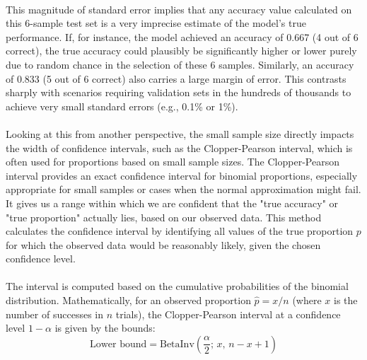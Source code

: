 \documentclass[12pt,a4paper]{report}
\begin{document}
\\
This magnitude of standard error implies that any accuracy value calculated on this 6-sample test set is a very imprecise estimate of the model's true performance. If, for instance, the model achieved an accuracy of 0.667 (4 out of 6 correct), the true accuracy could plausibly be significantly higher or lower purely due to random chance in the selection of these 6 samples. Similarly, an accuracy of 0.833 (5 out of 6 correct) also carries a large margin of error. This contrasts sharply with scenarios requiring validation sets in the hundreds of thousands to achieve very small standard errors (e.g., 0.1\% or 1\%).\\
\\
Looking at this from another perspective, the small sample size directly impacts the width of confidence intervals, such as the Clopper-Pearson interval, which is often used for proportions based on small sample sizes. The Clopper-Pearson interval provides an exact confidence interval for binomial proportions, especially appropriate for small samples or cases when the normal approximation might fail. It gives us a range within which we are confident that the "true accuracy" or "true proportion" actually lies, based on our observed data. This method calculates the confidence interval by identifying all values of the true proportion $p$ for which the observed data would be reasonably likely, given the chosen confidence level.\\
\\
The interval is computed based on the cumulative probabilities of the binomial distribution. Mathematically, for an observed proportion $\hat{p} = x/n$ (where $x$ is the number of successes in 
$n$ trials), the Clopper-Pearson interval at a confidence level $1-\alpha$ is given by the bounds:
\[
\text{Lower bound} = \text{BetaInv}\left(\frac{\alpha}{2};\, x,\, n - x + 1\right)
\]
\end{document}

